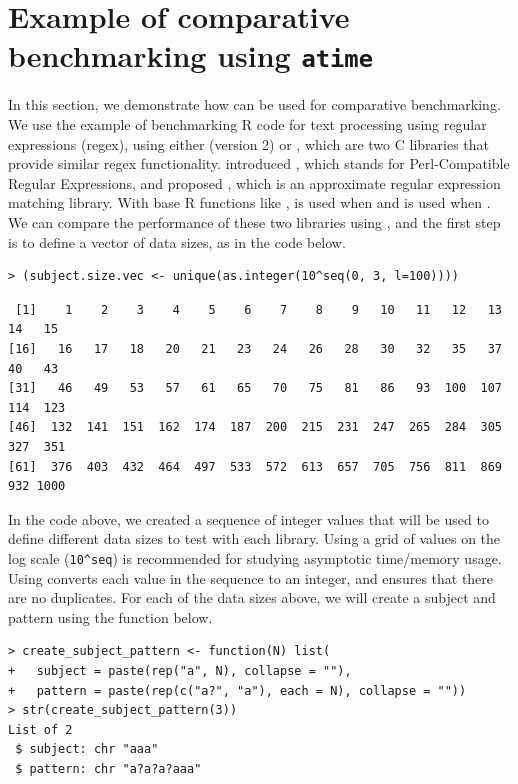 \section{Example of comparative benchmarking using \texttt{atime}}

In this section, we demonstrate how  can be used for comparative benchmarking.
We use the example of benchmarking R code for text processing using regular expressions (regex), using either  (version 2) or , which are two C libraries that provide similar regex functionality.
\citet{PCRE} introduced , which stands for Perl-Compatible Regular Expressions, and \citet{TRE} proposed , which is an approximate regular expression matching library.
With base R functions like ,  is used when  and  is used when .
We can compare the performance of these two libraries using , and the first step is to define a vector of data sizes, as in the code below.

\begin{Schunk}
\begin{verbatim}
> (subject.size.vec <- unique(as.integer(10^seq(0, 3, l=100))))
\end{verbatim}
\begin{verbatim}
 [1]    1    2    3    4    5    6    7    8    9   10   11   12   13   14   15
[16]   16   17   18   20   21   23   24   26   28   30   32   35   37   40   43
[31]   46   49   53   57   61   65   70   75   81   86   93  100  107  114  123
[46]  132  141  151  162  174  187  200  215  231  247  265  284  305  327  351
[61]  376  403  432  464  497  533  572  613  657  705  756  811  869  932 1000
\end{verbatim}
\end{Schunk}

In the code above, we created a sequence of integer values that will be used to define different data sizes to test with each library.
Using a grid of values on the log scale (\verb|10^seq|) is recommended for studying asymptotic time/memory usage.
Using  converts each value in the sequence to an integer, and  ensures that there are no duplicates.
For each of the data sizes above, we will create a subject and pattern using the function below.

\begin{Schunk}
\begin{verbatim}
> create_subject_pattern <- function(N) list(
+   subject = paste(rep("a", N), collapse = ""),
+   pattern = paste(rep(c("a?", "a"), each = N), collapse = ""))
> str(create_subject_pattern(3))
List of 2
 $ subject: chr "aaa"
 $ pattern: chr "a?a?a?aaa"
\end{verbatim}
\end{Schunk}

